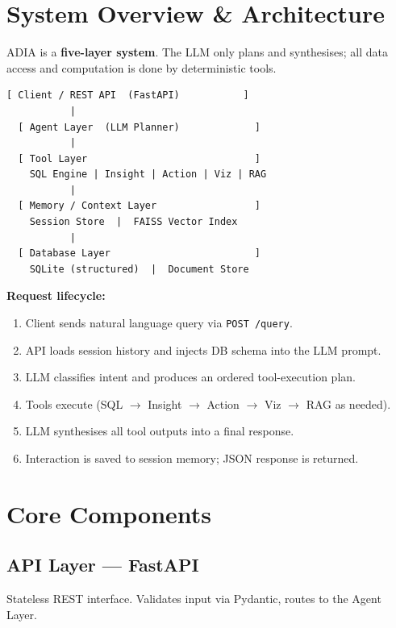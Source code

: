 \documentclass[11pt,a4paper]{article}
\begin{document}
\section{System Overview \& Architecture}

ADIA is a \textbf{five-layer system}. The LLM only plans and synthesises; all data access and computation is done by deterministic tools.

\begin{lstlisting}[language={}]
  [ Client / REST API  (FastAPI)           ]
           |
  [ Agent Layer  (LLM Planner)             ]
           |
  [ Tool Layer                             ]
    SQL Engine | Insight | Action | Viz | RAG
           |
  [ Memory / Context Layer                 ]
    Session Store  |  FAISS Vector Index
           |
  [ Database Layer                         ]
    SQLite (structured)  |  Document Store
\end{lstlisting}

\textbf{Request lifecycle:}
\begin{enumerate}
  \item Client sends natural language query via \texttt{POST /query}.
  \item API loads session history and injects DB schema into the LLM prompt.
  \item LLM classifies intent and produces an ordered tool-execution plan.
  \item Tools execute (SQL $\to$ Insight $\to$ Action $\to$ Viz $\to$ RAG as needed).
  \item LLM synthesises all tool outputs into a final response.
  \item Interaction is saved to session memory; JSON response is returned.
\end{enumerate}

\section{Core Components}

\subsection{API Layer --- FastAPI}
Stateless REST interface. Validates input via Pydantic, routes to the Agent Layer.
\end{document}
